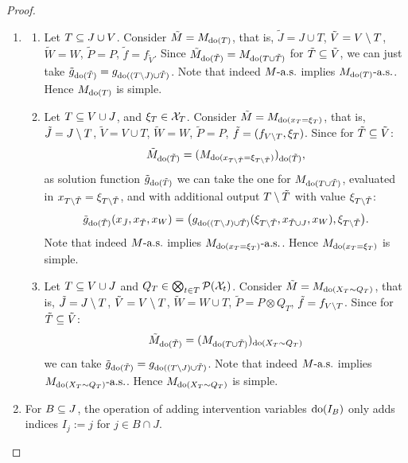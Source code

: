 \begin{proof}
  \begin{enumerate}
    \item 
      \begin{enumerate}[label=(\roman*)]
        \item
      Let $T \subseteq J \cup V$. 
      Consider $\tilde{M} = M_{\operatorname{do}(T)}$, that is, $\tilde{J} = J \cup T$, $\tilde{V} = V \setminus T$, $\tilde{W} = W$, $\tilde{P} = P$, $\tilde{f} = f_{\tilde{V}}$.
      Since $\tilde{M}_{\operatorname{do}(\tilde{T})} = M_{\operatorname{do}(T \cup \tilde{T})}$ for $\tilde{T} \subseteq \tilde{V}$, we can just take $\tilde{g}_{\operatorname{do}(\tilde{T})} = g_{\operatorname{do}((T \setminus J) \cup \tilde{T})}$.
      Note that indeed $M\text{-a.s.}$ implies $M_{\operatorname{do}(T)}\text{-a.s.}$.
      Hence $M_{\operatorname{do}(T)}$ is simple.
    \item
      Let $T \subseteq V \cup J$, and $\xi_T \in \mathcal{X}_T$. 
      Consider $\tilde{M} = M_{\operatorname{do}(x_T=\xi_T)}$, that is, $\tilde{J} = J \setminus T$, $\tilde{V} = V \cup T$, $\tilde{W} = W$, $\tilde{P} = P$, $\tilde{f} = (f_{V\setminus T},\xi_T)$. 
      Since for $\tilde{T} \subseteq \tilde{V}$:
      $$\tilde{M}_{\operatorname{do}(\tilde{T})} = (M_{\operatorname{do}(x_{T\setminus \tilde{T}}=\xi_{T\setminus \tilde{T}})})_{\operatorname{do}(\tilde{T})},$$
      as solution function $\tilde{g}_{\operatorname{do}(\tilde{T})}$ we can take the one for $M_{\operatorname{do}(T \cup \tilde{T})}$, evaluated in $x_{T\setminus \tilde{T}}=\xi_{T\setminus \tilde{T}}$, and with additional output $T \setminus \tilde{T}$ with value $\xi_{T\setminus \tilde{T}}$:
      $$\tilde{g}_{\operatorname{do}(\tilde{T})}(x_{\tilde{J}}, x_{\tilde{T}}, x_W) = \big(g_{\operatorname{do}((T\setminus J) \cup \tilde{T})}(\xi_{T \setminus \tilde{T}},x_{\tilde{T} \cup J},x_W),\xi_{T \setminus \tilde{T}}\big).$$
      Note that indeed $M\text{-a.s.}$ implies $M_{\operatorname{do}(x_T=\xi_T)}\text{-a.s.}$.
      Hence $M_{\operatorname{do}(x_T=\xi_T)}$ is simple.
    \item
      Let $T \subseteq V \cup J$ and $Q_T \in \bigotimes_{t\in T} \mathcal{P}(\mathcal{X}_t)$. 
      Consider $\tilde{M} = M_{\operatorname{do}(X_{T}\sim Q_T)}$, that is, $\tilde{J} = J\setminus T$, $\tilde{V} = V\setminus T$, $\tilde{W} = W\cup T$, $\tilde{P}=P \otimes Q_T$, $\tilde{f}=f_{V\setminus T}$.
      Since for $\tilde{T} \subseteq \tilde{V}$:
      $$\tilde{M}_{\operatorname{do}(\tilde{T})} = (M_{\operatorname{do}(T \cup \tilde{T})})_{\operatorname{do}(X_{T}\sim Q_T)}$$
      we can take
      $\tilde{g}_{\operatorname{do}(\tilde{T})} = g_{\operatorname{do}((T \setminus J) \cup \tilde{T})}$.
      Note that indeed $M\text{-a.s.}$ implies $M_{\operatorname{do}(X_{T}\sim Q_T)}\text{-a.s.}$.
      Hence $M_{\operatorname{do}(X_{T}\sim Q_T)}$ is simple.
      \end{enumerate}
    \item
      For $B \subseteq J$, the operation of adding intervention variables $\operatorname{do}(I_{B})$ only adds indices $I_j := j$ for $j \in B \cap J$.

\end{enumerate}
\end{proof}
